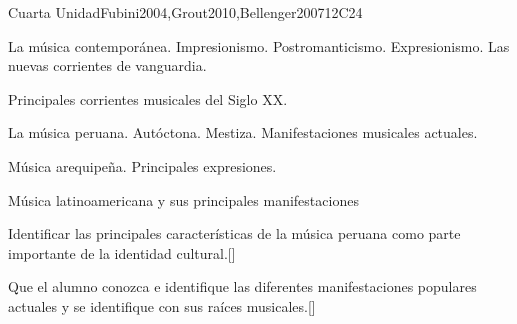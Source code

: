 \begin{syllabus}
\begin{unit}{}{Cuarta Unidad}{Fubini2004,Grout2010,Bellenger2007}{12}{C24}
\begin{topics}
	\item La música contemporánea.
		\subitem Impresionismo.
		\subitem Postromanticismo.
		\subitem Expresionismo.
		\subitem Las nuevas corrientes de vanguardia.
	\item Principales corrientes musicales del Siglo XX.
	\item La música peruana.
		\subitem Autóctona.
		\subitem Mestiza.
		\subitem Manifestaciones musicales actuales.
	\item Música arequipeña.
		\subitem Principales expresiones.
	\item Música latinoamericana y sus principales manifestaciones
\end{topics}
\begin{learningoutcomes}
	\item Identificar las principales características de la música peruana como parte importante de la identidad cultural.[\Usage]
	\item Que el alumno conozca e identifique las diferentes manifestaciones populares actuales y se identifique con sus raíces musicales.[\Usage]
\end{learningoutcomes}
\end{unit}

\begin{coursebibliography}
\end{coursebibliography}

\end{syllabus}
